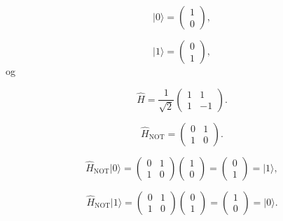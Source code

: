 \documentclass[%
oneside,                 %
final,                   %
10pt]{article}
\begin{document}
\begin{equation}
   \vert 0 \rangle=\left(\begin{array}{c} 1 \\ 0\end{array}   \right),
\end{equation}

\begin{equation}
   |1\rangle=\left(\begin{array}{c} 0 \\ 1\end{array}   \right),
\end{equation}
og

\begin{equation}
   \hat{H}=\frac{1}{\sqrt{2}}
   \left(\begin{array}{cc} 1 & 1 \\ 1& -1\end{array}   \right).
\end{equation}

\begin{equation}
   \hat{H}_{\mathrm{NOT}}=   
   \left(\begin{array}{cc} 0 & 1 \\ 1& 0\end{array}   \right).
\end{equation}

\begin{equation}
   \hat{H}_{\mathrm{NOT}}\vert 0 \rangle=   
   \left(\begin{array}{cc} 0 & 1 \\ 1& 0\end{array}\right)
   \left(\begin{array}{c} 1 \\ 0\end{array}   \right)=
   \left(\begin{array}{c} 0 \\ 1\end{array}   \right)=|1\rangle,
\end{equation}

\begin{equation}
   \hat{H}_{\mathrm{NOT}}|1\rangle=   
   \left(\begin{array}{cc} 0 & 1 \\ 1& 0\end{array}\right)
   \left(\begin{array}{c} 0 \\ 1\end{array}   \right)=
   \left(\begin{array}{c} 1 \\ 0\end{array}   \right)=\vert 0 \rangle.
\end{equation}
\end{document}
